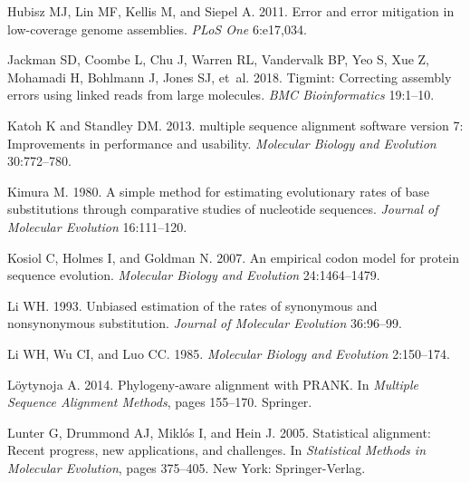 \documentclass[12pt,letterpaper]{article}
\begin{document}
\begin{thebibliography}{44}
Hubisz MJ, Lin MF, Kellis M, and Siepel A. 2011.
\newblock Error and error mitigation in low-coverage genome assemblies.
\newblock \emph{{PLoS} One} 6:e17,034.

Jackman SD, Coombe L, Chu J, Warren RL, Vandervalk BP, Yeo S, Xue Z, Mohamadi
  H, Bohlmann J, Jones SJ, et~al. 2018.
\newblock Tigmint: Correcting assembly errors using linked reads from large
  molecules.
\newblock \emph{BMC Bioinformatics} 19:1--10.

Katoh K and Standley DM. 2013.
 multiple sequence alignment software version 7: Improvements
  in performance and usability.
\newblock \emph{Molecular Biology and Evolution} 30:772--780.

Kimura M. 1980.
\newblock A simple method for estimating evolutionary rates of base
  substitutions through comparative studies of nucleotide sequences.
\newblock \emph{Journal of Molecular Evolution} 16:111--120.

Kosiol C, Holmes I, and Goldman N. 2007.
\newblock An empirical codon model for protein sequence evolution.
\newblock \emph{Molecular Biology and Evolution} 24:1464--1479.

Li WH. 1993.
\newblock Unbiased estimation of the rates of synonymous and nonsynonymous
  substitution.
\newblock \emph{Journal of Molecular Evolution} 36:96--99.

Li WH, Wu CI, and Luo CC. 1985.
\newblock \emph{Molecular Biology and Evolution} 2:150--174.

L{\"o}ytynoja A. 2014.
\newblock Phylogeny-aware alignment with {PRANK}.
\newblock In \emph{Multiple Sequence Alignment Methods}, pages 155--170.
  Springer.

Lunter G, Drummond AJ, Mikl{\'o}s I, and Hein J. 2005.
\newblock Statistical alignment: Recent progress, new applications, and
  challenges.
\newblock In \emph{Statistical Methods in Molecular Evolution}, pages 375--405.
  New York: Springer-Verlag.


\end{thebibliography}
\end{document}
